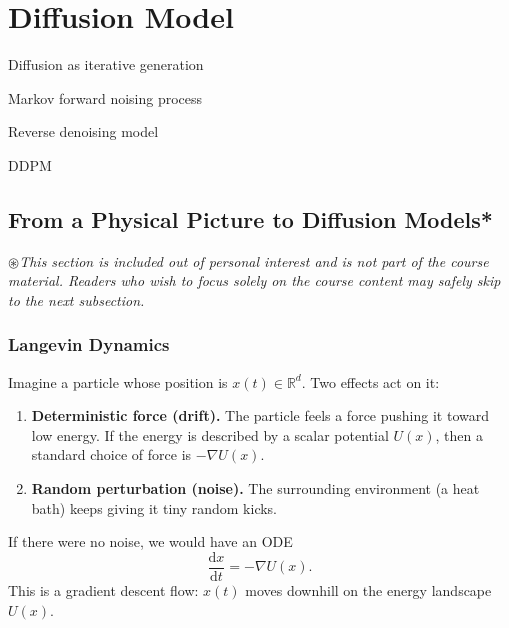 \documentclass[../main]{subfiles}
\begin{document}
\chapter{Diffusion Model}
\begin{introduction}
    \item Diffusion as iterative generation
    \item Markov forward noising process
    \item Reverse denoising model
    \item DDPM
\end{introduction}

\section{From a Physical Picture to Diffusion Models*}
\begin{tcolorbox}
    \vspace{0.5em}
        \color{red!50!black}$\circledast   $\quad\emph{{This section is included out of personal interest and is not part of the course material. 
        Readers who wish to focus solely on the course content may safely skip to the next subsection.}}
    \vspace{0.5em}
\end{tcolorbox}
\subsection{Langevin Dynamics}
Imagine a particle whose position is $x(t)\in\mathbb R^d$. Two effects act on it:

\begin{enumerate}
\item \textbf{Deterministic force (drift).} The particle feels a force pushing it toward low energy.
      If the energy is described by a scalar potential $U(x)$, then a standard choice of force is
      $-\nabla U(x)$.
\item \textbf{Random perturbation (noise).} The surrounding environment (a heat bath) keeps giving
      it tiny random kicks.
\end{enumerate}

If there were no noise, we would have an ODE
\begin{equation}\label{eq:gradflow-ode}
    \frac{\mathrm d x}{\mathrm dt} = -\nabla U(x).
\end{equation}
This is a gradient descent flow: $x(t)$ moves downhill on the energy landscape $U(x)$.
\end{document}
